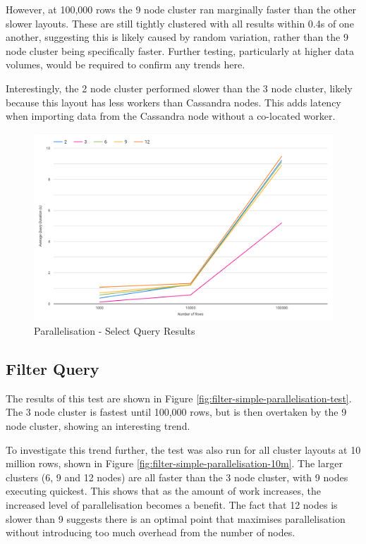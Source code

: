 However, at 100,000 rows the 9 node cluster ran marginally faster than the other slower layouts. These are still tightly clustered with all results within 0.4s of one another, suggesting this is likely caused by random variation, rather than the 9 node cluster being specifically faster. Further testing, particularly at higher data volumes, would be required to confirm any trends here. 

Interestingly, the 2 node cluster performed slower than the 3 node cluster, likely because this layout has less workers than Cassandra nodes. This adds latency when importing data from the Cassandra node without a co-located worker. 

\begin{figure}[ht]
	\centering
	\includegraphics[width=0.8\linewidth]{chapters/diagrams/testing/select-simple-parallelisation-test}
	\caption{Parallelisation - Select Query Results} 
	\label{fig:select-simple-parallelisation-test}
\end{figure}

\subsection{Filter Query}
The results of this test are shown in Figure \ref{fig:filter-simple-parallelisation-test}. The 3 node cluster is fastest until 100,000 rows, but is then overtaken by the 9 node cluster, showing an interesting trend.

To investigate this trend further, the test was also run for all cluster layouts at 10 million rows, shown in Figure \ref{fig:filter-simple-parallelisation-10m}. The larger clusters (6, 9 and 12 nodes) are all faster than the 3 node cluster, with 9 nodes executing quickest. This shows that as the amount of work increases, the increased level of parallelisation becomes a benefit. The fact that 12 nodes is slower than 9 suggests there is an optimal point that maximises parallelisation without introducing too much overhead from the number of nodes.

